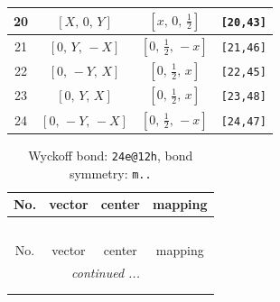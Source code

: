 \documentclass[fleqn,8pt]{jsarticle}
\begin{document}
\begin{longtable}{cccc}
20 & $\left[ X,\, 0,\, Y \right]$ & $\left[ x,\, 0,\, \frac{1}{2} \right]$ & {\tt [20,43]} \\ \hline
21 & $\left[ 0,\, Y,\, - X \right]$ & $\left[ 0,\, \frac{1}{2},\, - x \right]$ & {\tt [21,46]} \\ \hline
22 & $\left[ 0,\, - Y,\, X \right]$ & $\left[ 0,\, \frac{1}{2},\, x \right]$ & {\tt [22,45]} \\ \hline
23 & $\left[ 0,\, Y,\, X \right]$ & $\left[ 0,\, \frac{1}{2},\, x \right]$ & {\tt [23,48]} \\ \hline
24 & $\left[ 0,\, - Y,\, - X \right]$ & $\left[ 0,\, \frac{1}{2},\, - x \right]$ & {\tt [24,47]} \\
\end{longtable}
\renewcommand{\arraystretch}{1.2}
\begin{longtable}{cccc}
\caption{Wyckoff bond: {\tt 24e@12h}, bond symmetry: {\tt m..}}
 \\
 \hline \hline
No. & vector & center & mapping \\ \hline \endfirsthead

\multicolumn{3}{l}{\tablename\ \thetable{}} \\
 \hline \hline
No. & vector & center & mapping \\ \hline \endhead

 \hline \hline
\multicolumn{3}{r}{\footnotesize\it continued ...} \\ \endfoot

 \hline \hline
\multicolumn{3}{r}{} \\ \endlastfoot


\end{longtable}
\end{document}
